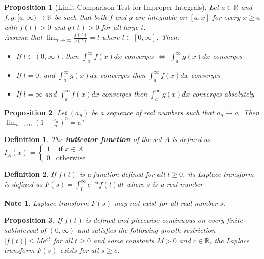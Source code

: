 \documentclass[14pt,twoside]{extreport}
\theoremstyle{dotless}
\newtheorem*{defn}{Definition}
\newtheorem*{note}{Note} %
\newtheorem*{prop}{Proposition} %
\begin{document}
\begin{prop}[Limit Comparison Test for Improper Integrals]
    Let $a \in \mathbb{R}$ and $f,g: [a, \infty) \to \mathbb{R}$ be such that both $f$ and $g$ are integrable on $[a,x]$ for every $x \geq a$ with $f(t) > 0$ and $g(t) > 0$ for all large $t$. \\ Assume that
    $\displaystyle \lim_{t \to \infty} \frac{f(t)}{g(t)} = l$ where $l \in [0, \infty]$. Then:
    \begin{itemize}
        \item If $l \in (0, \infty)$, then $\int_a^\infty f(x)dx$ converges $\iff$ $\int_a^\infty g(x)dx$ converges
        \item If $l = 0$, and $\int_a^\infty g(x)dx$ converges then $\int_a^\infty f(x)dx$ converges
        \item If $l = \infty$ and $\int_a^\infty f(x)dx$ converges then $\int_a^\infty g(x)dx$ converges absolutely
    \end{itemize}
\end{prop}

\begin{prop}
    Let $(a_n)$ be a sequence of real numbers such that $a_n \to a$. Then $\lim_{n \to \infty} \left( 1 + \frac{a_n}{n} \right)^n = e^a$ 
\end{prop}

\begin{defn}
    The \textbf{indicator function} of the set $A$ is defined as $I_A (x) = \begin{cases} 1 & \text{ if } x \in A \\ 0 & \text{otherwise} \end{cases}$
\end{defn}

\begin{defn}
    If $f(t)$ is a function defined for all $t \geq 0$, its Laplace transform is defined as $F(s) = \int_0^\infty e^{-st} f(t) dt$ where $s$ is a real number
\end{defn}

\begin{note}
    Laplace transform $F(s)$ may not exist for all real number $s$.
\end{note}

\begin{prop}
    If $f(t)$ is defined and piecewise continuous on every finite subinterval of $(0, \infty)$ and satisfies the following growth restriction $|f(t)| \leq M e^{ct}$ for all $t \geq 0$ and some constants $M > 0$ and $c \in \mathbb{R}$, the Laplace transform $F(s)$ exists for all $s \geq c$.
\end{prop}
\end{document}

